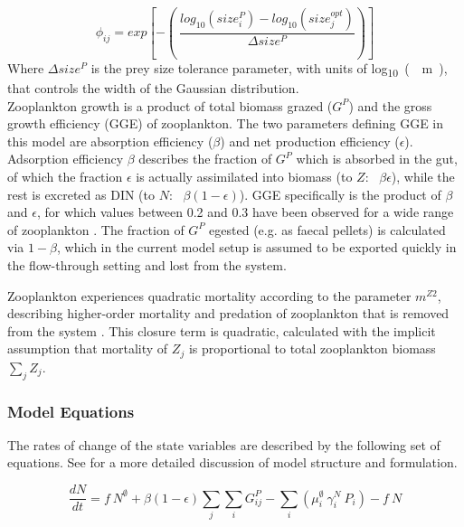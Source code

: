 \documentclass[template.tex]{subfiles}
\begin{document}
\begin{equation}
    \phi_{ij} = exp \left[ -\left( \ \frac{ log_{10}(size_i^{P}) - log_{10}(size_j^{opt}) }{ \Delta size^{P} } \right) \right]
\end{equation}
Where $\Delta size^{P}$ is the prey size tolerance parameter, with units of \unit{log_{10}(\mu m)}, that controls the width of the Gaussian distribution.\\

Zooplankton growth is a product of total biomass grazed ($G^P$) and the gross growth efficiency (GGE) of zooplankton. The two parameters defining GGE in this model are absorption efficiency ($\beta$) and net production efficiency ($\epsilon$). Adsorption efficiency $\beta$ describes the fraction of $G^P$ which is absorbed in the gut, of which the fraction $\epsilon$ is actually assimilated into biomass (to $Z$: \ $\beta \epsilon$), while the rest is excreted as DIN (to $N$: \ $\beta (1-\epsilon)$). GGE specifically is the product of $\beta$ and $\epsilon$, for which values between 0.2 and 0.3 have been observed for a wide range of zooplankton  \citep{Straile1997GrossGroup}. The fraction of $G^P$ egested (e.g. as faecal pellets) is calculated via $1-\beta$, which in the current model setup is assumed to be exported quickly in the flow-through setting and lost from the system. 

 Zooplankton experiences quadratic mortality according to the parameter $m^{Z2}$, describing higher-order mortality and predation of zooplankton that is removed from the system \citep{Edwards2000TheModels}. This closure term is quadratic, calculated with the implicit assumption that mortality of $Z_j$ is proportional to total zooplankton biomass $\sum_{j} Z_j$.


\subsubsection{Model Equations}
The rates of change of the state variables are described by the following set of equations.
See \citet{Banas2011b} for a more detailed discussion of model structure and formulation. 

\begin{equation}
    \frac{d N}{d t} = 
    f \ N^\emptyset %
    +  \beta (1 - \epsilon) \sum_{j} \sum_{i} G_{ij}^P %
    - \sum_{i} ( \mu_i^{\emptyset} \ \gamma_i^N \ P_i) %
    - f \ N
\end{equation}
\end{document}
